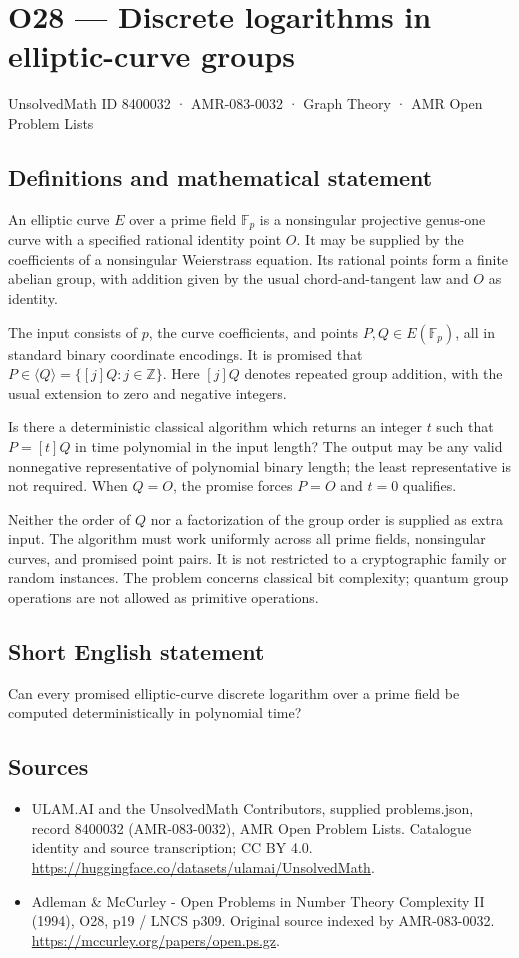\documentclass[11pt,a4paper]{article}
\begin{document}
\section*{O28 — Discrete logarithms in elliptic-curve groups}\label{8400032}
{\small UnsolvedMath ID 8400032 · AMR-083-0032 · Graph Theory · AMR Open Problem Lists}
\subsection{Definitions and mathematical statement}
An elliptic curve $E$ over a prime field $\mathbb F_p$ is a nonsingular projective genus-one curve with a specified rational identity point $O$. It may be supplied by the coefficients of a nonsingular Weierstrass equation. Its rational points form a finite abelian group, with addition given by the usual chord-and-tangent law and $O$ as identity.

The input consists of $p$, the curve coefficients, and points $P,Q\in E(\mathbb F_p)$, all in standard binary coordinate encodings. It is promised that $P\in\langle Q\rangle=\{[j]Q:j\in\mathbb Z\}$. Here $[j]Q$ denotes repeated group addition, with the usual extension to zero and negative integers.

Is there a deterministic classical algorithm which returns an integer $t$ such that $P=[t]Q$ in time polynomial in the input length? The output may be any valid nonnegative representative of polynomial binary length; the least representative is not required. When $Q=O$, the promise forces $P=O$ and $t=0$ qualifies.

Neither the order of $Q$ nor a factorization of the group order is supplied as extra input. The algorithm must work uniformly across all prime fields, nonsingular curves, and promised point pairs. It is not restricted to a cryptographic family or random instances. The problem concerns classical bit complexity; quantum group operations are not allowed as primitive operations.
\subsection{Short English statement}
Can every promised elliptic-curve discrete logarithm over a prime field be computed deterministically in polynomial time?
\subsection{Sources}
\begin{itemize}
\item[S1] ULAM.AI and the UnsolvedMath Contributors, supplied problems.json, record 8400032 (AMR-083-0032), AMR Open Problem Lists. Catalogue identity and source transcription; CC BY 4.0.
\url{https://huggingface.co/datasets/ulamai/UnsolvedMath}.
\item[S2] Adleman \& McCurley - Open Problems in Number Theory Complexity II (1994), O28, p19 / LNCS p309. Original source indexed by AMR-083-0032.
\url{https://mccurley.org/papers/open.ps.gz}.
\end{itemize}
\end{document}
